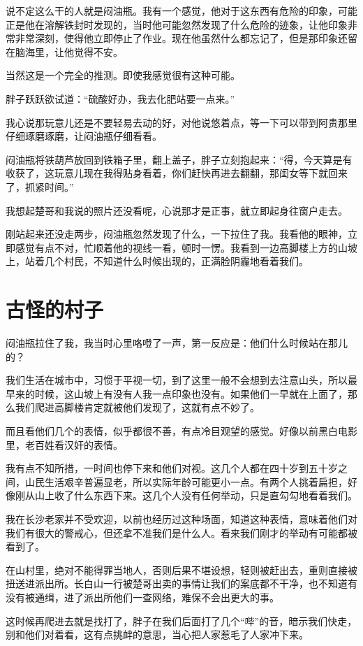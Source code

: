 说不定这么干的人就是闷油瓶。我有一个感觉，他对于这东西有危险的印象，可能正是他在溶解铁封时发现的，当时他可能忽然发现了什么危险的迹象，让他印象非常非常深刻，使得他立即停止了作业。现在他虽然什么都忘记了，但是那印象还留在脑海里，让他觉得不安。

当然这是一个完全的推测。即使我感觉很有这种可能。

胖子跃跃欲试道：“硫酸好办，我去化肥站要一点来。”

我心说那玩意儿还是不要轻易去动的好，对他说悠着点，等一下可以带到阿贵那里仔细琢磨琢磨，让闷油瓶仔细看看。

闷油瓶将铁葫芦放回到铁箱子里，翻上盖子，胖子立刻抱起来：“得，今天算是有收获了，这玩意儿现在我得贴身看着，你们赶快再进去翻翻，那闺女等下就回来了，抓紧时间。”

我想起楚哥和我说的照片还没看呢，心说那才是正事，就立即起身往窗户走去。

刚站起来还没走两步，闷油瓶忽然发现了什么，一下拉住了我。我看他的眼神，立即感觉有点不对，忙顺着他的视线一看，顿时一愣。我看到一边高脚楼上方的山坡上，站着几个村民，不知道什么时候出现的，正满脸阴霾地看着我们。

\chapter{古怪的村子}

闷油瓶拉住了我，我当时心里咯噔了一声，第一反应是：他们什么时候站在那儿的？

我们生活在城市中，习惯于平视一切，到了这里一般不会想到去注意山头，所以最早来的时候，这山坡上有没有人我一点印象也没有。如果他们一早就在上面了，那么我们爬进高脚楼肯定就被他们发现了，这就有点不妙了。

而且看他们几个的表情，似乎都很不善，有点冷目观望的感觉。好像以前黑白电影里，老百姓看汉奸的表情。

我有点不知所措，一时间也停下来和他们对视。这几个人都在四十岁到五十岁之间，山民生活艰辛普遍显老，所以实际年龄可能更小一点。有两个人挑着扁担，好像刚从山上收了什么东西下来。这几个人没有任何举动，只是直勾勾地看着我们。

我在长沙老家并不受欢迎，以前也经历过这种场面，知道这种表情，意味着他们对我们有很大的警戒心，但还拿不准我们是什么人。看来我们刚才的举动有可能都被看到了。

在山村里，绝对不能得罪当地人，否则后果不堪设想，轻则被赶出去，重则直接被扭送进派出所。长白山一行被楚哥出卖的事情让我们的案底都不干净，也不知道有没有被通缉，进了派出所他们一查网络，难保不会出更大的事。

这时候再爬进去就是找打了，胖子在我们后面打了几个“哔”的音，暗示我们快走，别和他们对着看，这有点挑衅的意思，当心把人家惹毛了人家冲下来。

